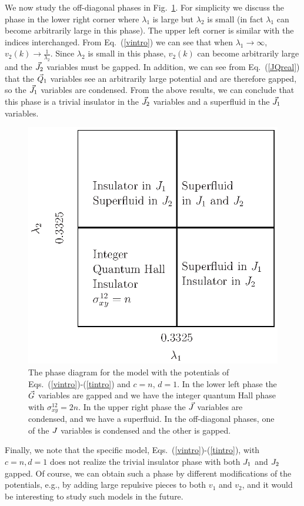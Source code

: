 We now study the off-diagonal phases in Fig.~\ref{intphase}. For simplicity we discuss the phase in the lower right corner where $\lambda_1$ is large but $\lambda_2$ is small (in fact $\lambda_1$ can become arbitrarily large in this phase). The upper left corner is similar with the indices interchanged. From Eq.~(\ref{vintro}) we can see that when $\lambda_1\rightarrow\infty$,  $v_2(k)\rightarrow\frac{1}{\lambda_2}$. Since $\lambda_2$ is small in this phase, $v_2(k)$ can become arbitrarily large and the $\vec{J}_2$ variables must be gapped. In addition, we can see from Eq.~(\ref{JQreal}) that the $\vec{Q}_1$ variables see an arbitrarily large potential and are therefore gapped, so the $\vec{J}_1$ variables are condensed. From the above results, we can conclude that this phase is a trivial insulator in the $\vec{J}_2$ variables and a superfluid in the $\vec{J}_1$ variables.

\begin{figure}
\includegraphics[width=0.6\linewidth]{figures/intphase.eps}
\caption{The phase diagram for the model with the potentials of Eqs.~(\ref{vintro})-(\ref{tintro}) and $c=n$, $d=1$. In the lower left phase the $\vec{G}$ variables are gapped and we have the integer quantum Hall phase with $\sigma^{12}_{xy}=2n$. In the upper right phase the $\vec{J}$ variables are condensed, and we have a superfluid.  In the off-diagonal phases, one of the $J$ variables is condensed and the other is gapped.}
\label{intphase}
\end{figure}

Finally, we note that the specific model, Eqs.~(\ref{vintro})-(\ref{tintro}), with $c=n, d=1$ does not realize the trivial insulator phase with both $J_1$ and $J_2$ gapped.  Of course, we can obtain such a phase by different modifications of the potentials, e.g., by adding large repulsive pieces to both $v_1$ and $v_2$, and it would be interesting to study such models in the future.


